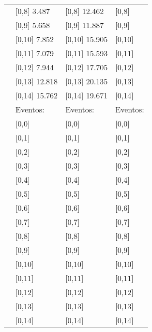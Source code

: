\begin{table}
\begin{tabular}[t]{llll}
\addlinespace
 & {}[0,8] 3.487 & {}[0,8] 12.462 & {}[0,8]\\
 & {}[0,9] 5.658 & {}[0,9] 11.887 & {}[0,9]\\
 & {}[0,10] 7.852 & {}[0,10] 15.905 & {}[0,10]\\
 & {}[0,11] 7.079 & {}[0,11] 15.593 & {}[0,11]\\
 & {}[0,12] 7.944 & {}[0,12] 17.705 & {}[0,12]\\
\addlinespace
 & {}[0,13] 12.818 & {}[0,13] 20.135 & {}[0,13]\\
 & {}[0,14] 15.762 & {}[0,14] 19.671 & {}[0,14]\\
 & Eventos: & Eventos: & Eventos:\\
 & {}[0,0] & {}[0,0] & {}[0,0]\\
 & {}[0,1] & {}[0,1] & {}[0,1]\\
\addlinespace
 & {}[0,2] & {}[0,2] & {}[0,2]\\
 & {}[0,3] & {}[0,3] & {}[0,3]\\
 & {}[0,4] & {}[0,4] & {}[0,4]\\
 & {}[0,5] & {}[0,5] & {}[0,5]\\
 & {}[0,6] & {}[0,6] & {}[0,6]\\
\addlinespace
1000 & {}[0,7] & {}[0,7] & {}[0,7]\\
 & {}[0,8] & {}[0,8] & {}[0,8]\\
 & {}[0,9] & {}[0,9] & {}[0,9]\\
 & {}[0,10] & {}[0,10] & {}[0,10]\\
 & {}[0,11] & {}[0,11] & {}[0,11]\\
\addlinespace
 & {}[0,12] & {}[0,12] & {}[0,12]\\
 & {}[0,13] & {}[0,13] & {}[0,13]\\
 & {}[0,14] & {}[0,14] & {}[0,14]\\
\bottomrule
\end{tabular}
\end{table}
